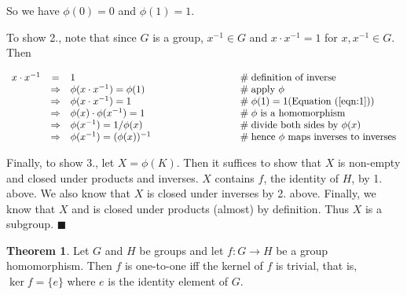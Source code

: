 \documentclass{article}
\theoremstyle{definition}
\newtheorem{theorem}{Theorem}[section]
\begin{document}
\bigskip
\noindent
So we have $\phi(0) = 0$ and  $\phi(1) = 1$. 

\bigskip
\noindent
To show 2., note that since $G$ is a group, $x^{-1} \in G$ and
$x \cdot x^{-1} = 1$ for $x, x^{-1}  \in G$. Then 

\begin{equation}
\begin{array}{rcll}
 x \cdot x^{-1}
&=& 1                                           &\hspace{8em} \mathrel{\#} \text{definition of inverse} \\
&\Rightarrow& \phi(x \cdot x^{-1}) = \phi(1)    &\hspace{8em} \mathrel{\#} \text{apply $\phi$} \\
&\Rightarrow& \phi(x \cdot x^{-1}) = 1          &\hspace{8em} \mathrel{\#} \phi(1) =1 \text{(Equation (\ref{eqn:1}))} \\
&\Rightarrow& \phi(x) \cdot \phi(x^{-1}) = 1	&\hspace{8em} \mathrel{\#} \phi \text{ is a homomorphism} \\
&\Rightarrow& \phi(x^{-1}) = 1/\phi(x)			&\hspace{8em} \mathrel{\#} \text{divide both sides by } \phi(x) \\
&\Rightarrow& \phi(x^{-1}) = (\phi(x))^{-1}		&\hspace{8em} \mathrel{\#} \text{hence $\phi$ maps inverses to inverses}
\end{array}
\label{eqn:inverse}
\end{equation}

\bigskip
\noindent
Finally, to show 3., let $X = \phi(K)$. Then it suffices to show
that $X$ is non-empty and closed under products and inverses. $X$
contains $f$, the identity of $H$, by 1.  above. We also know
that $X$ is closed under inverses by 2. above. Finally, we know
that $X$ and is closed under products (almost) by
definition. Thus $X$ is a subgroup.  $\blacksquare$

\begin{theorem}
Let $G$ and $H$ be groups and let $f: G \rightarrow H$ be a group
homomorphism. Then $f$ is one-to-one iff the kernel of $f$ is
trivial, that is, $\ker f = \{e\}$ where $e$ is the identity
element of $G$.
\end{theorem}
\end{document}

